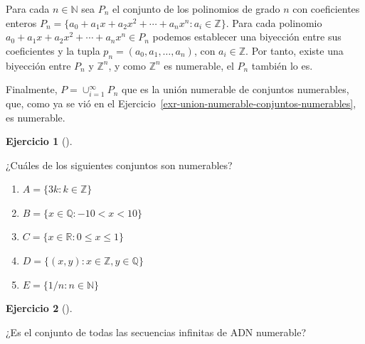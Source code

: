 \documentclass[
  a4paper,
]{scrreport}
\providecommand{\tightlist}{%
  \setlength{\itemsep}{0pt}\setlength{\parskip}{0pt}}\usepackage{longtable,booktabs,array}
\theoremstyle{definition}
\newtheorem{exercise}{Ejercicio}[chapter]
\theoremstyle{remark}
\begin{document}
\begin{tcolorbox}[enhanced jigsaw, breakable, title=\textcolor{quarto-callout-tip-color}{\faLightbulb}\hspace{0.5em}{Solución}, left=2mm, leftrule=.75mm, colback=white, bottomtitle=1mm, coltitle=black, bottomrule=.15mm, colframe=quarto-callout-tip-color-frame, colbacktitle=quarto-callout-tip-color!10!white, rightrule=.15mm, opacitybacktitle=0.6, arc=.35mm, toprule=.15mm, opacityback=0, toptitle=1mm, titlerule=0mm]
Para cada \(n\in\mathbb{N}\) sea \(P_n\) el conjunto de los polinomios
de grado \(n\) con coeficientes enteros
\(P_n=\{a_0+a_1x+a_2x^2+\cdots+a_nx^n: a_i\in \mathbb{Z}\}\). Para cada
polinomio \(a_0+a_1x+a_2x^2+\cdots+a_nx^n\in P_n\) podemos establecer
una biyección entre sus coeficientes y la tupla
\(p_n=(a_0,a_1,\ldots,a_n)\), con \(a_i\in\mathbb{Z}\). Por tanto,
existe una biyección entre \(P_n\) y \(\mathbb{Z}^n\), y como
\(\mathbb{Z}^n\) es numerable, el \(P_n\) también lo es.

Finalmente, \(P=\cup_{i=1}^\infty P_n\) que es la unión numerable de
conjuntos numerables, que, como ya se vió en el
Ejercicio~\ref{exr-union-numerable-conjuntos-numerables}, es numerable.
\end{tcolorbox}

\leavevmode{}%
\begin{exercise}[]\label{exr-conjuntos-numerables}

¿Cuáles de los siguientes conjuntos son numerables?

\begin{enumerate}
\def\labelenumi{\alph{enumi}.}
\tightlist
\item
  \(A=\{3k: k\in \mathbb{Z}\}\)
\item
  \(B=\{x\in \mathbb{Q}: -10 < x < 10\}\)
\item
  \(C = \{x\in \mathbb{R}: 0\leq x\leq 1\}\)
\item
  \(D=\{(x,y): x\in \mathbb{Z}, y\in \mathbb{Q}\}\)
\item
  \(E=\{1/n : n\in \mathbb{N}\}\)
\end{enumerate}

\end{exercise}

\leavevmode{}%
\begin{exercise}[]\label{exr-conjunto-secuencias-adn-numerable}

¿Es el conjunto de todas las secuencias infinitas de ADN numerable?

\end{exercise}
\end{document}
